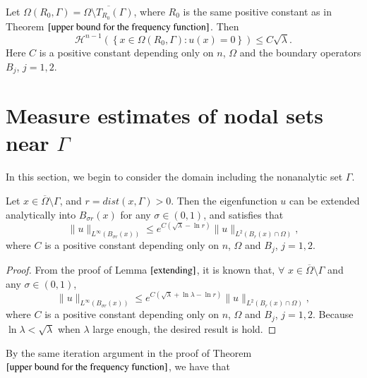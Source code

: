 \documentclass[a4paper, 12pt, onecolumn]{article} \textwidth 148mm
\begin{document}
\begin{theorem}\label{nodal set of interior domain}
Let $\Omega(R_0,\Gamma)=\overline{\Omega\setminus T_{R_0}(\Gamma)}$, where $R_0$ is the same positive constant as in Theorem $\ref{upper bound for the frequency function}$. Then
\begin{equation}
\mathcal{H}^{n-1}\left(\left\{x\in\Omega(R_0,\Gamma):u(x)=0\right\}\right)\leq C\sqrt{\lambda}.
\end{equation}
Here $C$ is a positive constant depending only on $n$, $\Omega$ and the boundary operators $B_j$, $j=1,2$.
\end{theorem}



\section{Measure estimates of nodal sets near $\Gamma$}

In this section, we begin to consider the domain including the nonanalytic set $\Gamma$.


\begin{lemma}\label{extending near x0}
Let $x\in\overline{\Omega}\setminus\Gamma$, and $r=dist(x,\Gamma)>0$.
Then the eigenfunction $u$ can be extended analytically into $B_{\sigma r}(x)$ for any $\sigma\in(0,1)$, and satisfies that
\begin{equation}
\|u\|_{L^{\infty}(B_{\sigma r}(x))}\leq e^{C(\sqrt{\lambda}-\ln r)}\|u\|_{L^2(B_r(x)\cap\Omega)},
\end{equation}
where $C$ is a positive constant depending only on $n$, $\Omega$ and $B_j$, $j=1,2$.
\end{lemma}

\begin{proof}
From the proof of Lemma $\ref{extending}$, it is known that, $\forall$ $x\in\overline{\Omega}\setminus\Gamma$ and any $\sigma\in(0,1)$,
\begin{equation*}
\|u\|_{L^{\infty}(B_{\sigma r}(x))}
\leq e^{C(\sqrt{\lambda}+\ln\lambda-\ln r)}\|u\|_{L^2(B_{r}(x)\cap\Omega)},
\end{equation*}
where $C$ is a positive constant depending only on $n$, $\Omega$ and $B_j$, $j=1,2$. Because $\ln\lambda<\sqrt{\lambda}$ when $\lambda$ large enough, the desired result is hold.
\end{proof}

By the same iteration argument in the proof of Theorem $\ref{upper bound for the frequency function}$, we have that
\end{document}
